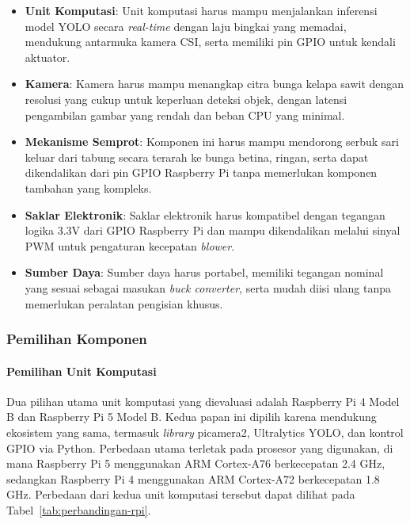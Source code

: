 \begin{itemize}
    \item \textbf{Unit Komputasi}: Unit komputasi harus mampu menjalankan inferensi model YOLO secara \emph{real-time} dengan laju bingkai yang memadai, mendukung antarmuka kamera CSI, serta memiliki pin GPIO untuk kendali aktuator.
    \item \textbf{Kamera}: Kamera harus mampu menangkap citra bunga kelapa sawit dengan resolusi yang cukup untuk keperluan deteksi objek, dengan latensi pengambilan gambar yang rendah dan beban CPU yang minimal.
    \item \textbf{Mekanisme Semprot}: Komponen ini harus mampu mendorong serbuk sari keluar dari tabung secara terarah ke bunga betina, ringan, serta dapat dikendalikan dari pin GPIO Raspberry Pi tanpa memerlukan komponen tambahan yang kompleks.
    \item \textbf{Saklar Elektronik}: Saklar elektronik harus kompatibel dengan tegangan logika 3.3V dari GPIO Raspberry Pi dan mampu dikendalikan melalui sinyal PWM untuk pengaturan kecepatan \emph{blower}.
    \item \textbf{Sumber Daya}: Sumber daya harus portabel, memiliki tegangan nominal yang sesuai sebagai masukan \emph{buck converter}, serta mudah diisi ulang tanpa memerlukan peralatan pengisian khusus.
\end{itemize}

\subsubsection{Pemilihan Komponen}
\label{subsubsec:pemilihan-komponen}

\paragraph{Pemilihan Unit Komputasi}

Dua pilihan utama unit komputasi yang dievaluasi adalah Raspberry Pi 4 Model B dan Raspberry Pi 5 Model B. Kedua papan ini dipilih karena mendukung ekosistem yang sama, termasuk \emph{library} picamera2, Ultralytics YOLO, dan kontrol GPIO via Python. Perbedaan utama terletak pada prosesor yang digunakan, di mana Raspberry Pi 5 menggunakan ARM Cortex-A76 berkecepatan 2.4 GHz, sedangkan Raspberry Pi 4 menggunakan ARM Cortex-A72 berkecepatan 1.8 GHz. Perbedaan dari kedua unit komputasi tersebut dapat dilihat pada Tabel~\ref{tab:perbandingan-rpi}.

